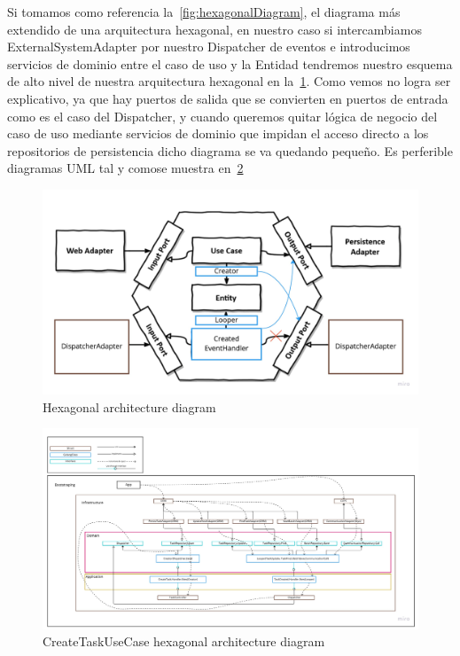 
Si tomamos como referencia la~\cref{fig:hexagonalDiagram}, el diagrama más extendido de una arquitectura hexagonal, en nuestro caso si intercambiamos ExternalSystemAdapter por nuestro Dispatcher de eventos e introducimos servicios de dominio entre el caso de uso y la Entidad tendremos nuestro esquema de alto nivel de nuestra arquitectura hexagonal en la~\cref{fig:CreateTaskHexagonalDiagram}. Como vemos no logra ser explicativo, ya que hay puertos de salida que se convierten en puertos de entrada como es el caso del Dispatcher, y cuando queremos quitar lógica de negocio del caso de uso mediante servicios de dominio que impidan el acceso directo a los repositorios de persistencia dicho diagrama se va quedando pequeño. Es perferible diagramas UML tal y comose muestra en~\cref{fig:createTaskUseCaseArchitecture}

\begin{figure}[H]
    \centering
    \includegraphics[height=0.3\textheight]{./part/Ejecucion/Seguimiento/CreateTaskUseCase/img/CreateTaskHexagonalDiagram}
    \caption{Hexagonal architecture diagram}\label{fig:CreateTaskHexagonalDiagram}
\end{figure}

\begin{figure}[H]
    \centering
    \includegraphics[height=0.3\textheight]{./part/Ejecucion/Seguimiento/CreateTaskUseCase/img/createTaskUseCaseArchitecture}
    \caption{CreateTaskUseCase hexagonal architecture diagram}\label{fig:createTaskUseCaseArchitecture}
\end{figure}


